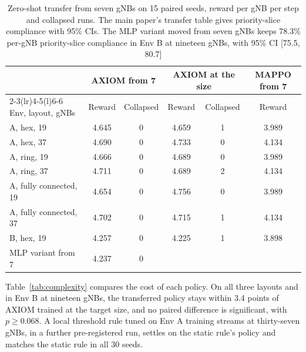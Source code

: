 \documentclass[9pt]{extarticle}
\begin{document}
\begin{table}[!htbp]
\caption{Zero-shot transfer from seven gNBs on 15 paired seeds, reward per gNB per step and collapsed runs. The main paper's transfer table gives priority-slice compliance with 95\% CIs. The MLP variant moved from seven gNBs keeps 78.3\% per-gNB priority-slice compliance in Env B at nineteen gNBs, with 95\% CI [75.5, 80.7]}
\label{tab:s-transfer}
\centering
\scriptsize
{\setlength{\tabcolsep}{3pt}
\begin{tabular}{@{}lccccc@{}}
\toprule
& \multicolumn{2}{c}{AXIOM from 7} & \multicolumn{2}{c}{AXIOM at the size} & MAPPO from 7 \\
\cmidrule(lr){2-3}\cmidrule(lr){4-5}\cmidrule(l){6-6}
Env, layout, gNBs & Reward & Collapsed & Reward & Collapsed & Reward \\
\midrule
A, hex, 19 & 4.645 & 0 & 4.659 & 1 & 3.989 \\
A, hex, 37 & 4.690 & 0 & 4.733 & 0 & 4.134 \\
A, ring, 19 & 4.666 & 0 & 4.689 & 0 & 3.989 \\
A, ring, 37 & 4.711 & 0 & 4.689 & 2 & 4.134 \\
A, fully connected, 19 & 4.654 & 0 & 4.756 & 0 & 3.989 \\
A, fully connected, 37 & 4.702 & 0 & 4.715 & 1 & 4.134 \\
B, hex, 19 & 4.257 & 0 & 4.225 & 1 & 3.898 \\
\quad MLP variant from 7 & 4.237 & 0 & & & \\
\bottomrule
\end{tabular}}
\end{table}

Table~\ref{tab:complexity} compares the cost of each policy. On all three layouts and in Env B at nineteen gNBs, the transferred policy stays within 3.4 points of AXIOM trained at the target size, and no paired difference is significant, with $p\geq0.068$. A local threshold rule tuned on Env A training streams at thirty-seven gNBs, in a further pre-registered run, settles on the static rule's policy and matches the static rule in all 30 seeds.
\end{document}
